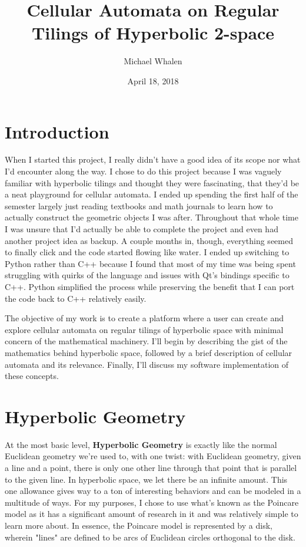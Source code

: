 \documentclass[letterpaper,12pt]{article}
\begin{document}
\doublespacing
\title{Cellular Automata on Regular Tilings of Hyperbolic 2-space}
\author{Michael Whalen}
\date{April 18, 2018}
\maketitle
\setlength{\parindent}{4em}

\section*{Introduction}

When I started this project, I really didn't have a good idea of its scope nor what I'd encounter along the way. I chose to do this project because I was vaguely familiar with hyperbolic tilings and thought they were fascinating, that they'd be a neat playground for cellular automata. I ended up spending the first half of the semester largely just reading textbooks and math journals to learn how to actually construct the geometric objects I was after. Throughout that whole time I was unsure that I'd actually be able to complete the project and even had another project idea as backup. A couple months in, though, everything seemed to finally click and the code started flowing like water. I ended up switching to Python rather than C++ because I found that most of my time was being spent struggling with quirks of the language and issues with Qt's bindings specific to C++. Python simplified the process while preserving the benefit that I can port the code back to C++ relatively easily.

The objective of my work is to create a platform where a user can create and explore cellular automata on regular tilings of hyperbolic space with minimal concern of the mathematical machinery.
I'll begin by describing the gist of the mathematics behind hyperbolic space, followed by a brief description of cellular automata and its relevance. Finally, I'll discuss my software implementation of these concepts.

\section*{Hyperbolic Geometry}

At the most basic level, \textbf{Hyperbolic Geometry} is exactly like the normal Euclidean geometry we're used to, with one twist: with Euclidean geometry, given a line and a point, there is only one other line through that point that is parallel to the given line. In hyperbolic space, we let there be an infinite amount. This one allowance gives way to a ton of interesting behaviors and can be modeled in a multitude of ways. For my purposes, I chose to use what's known as the Poincare model as it has a significant amount of research in it and was relatively simple to learn more about. In essence, the Poincare model is represented by a disk, wherein "lines" are defined to be arcs of Euclidean circles orthogonal to the disk.
\end{document}
